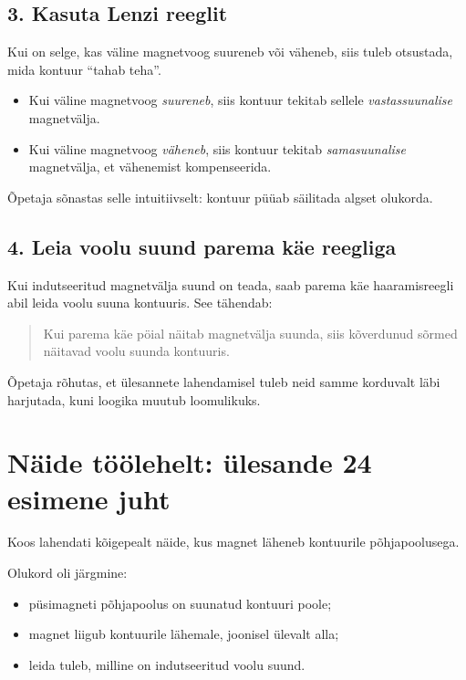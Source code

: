\documentclass[a4paper,11pt]{article}
\begin{document}
\subsection{3. Kasuta Lenzi reeglit}

Kui on selge, kas väline magnetvoog suureneb või väheneb, siis tuleb otsustada, mida kontuur ``tahab teha''.

\begin{itemize}
    \item Kui väline magnetvoog \emph{suureneb}, siis kontuur tekitab sellele \emph{vastassuunalise} magnetvälja.
    \item Kui väline magnetvoog \emph{väheneb}, siis kontuur tekitab \emph{samasuunalise} magnetvälja, et vähenemist kompenseerida.
\end{itemize}

Õpetaja sõnastas selle intuitiivselt: kontuur püüab säilitada algset olukorda.

\subsection{4. Leia voolu suund parema käe reegliga}

Kui indutseeritud magnetvälja suund on teada, saab parema käe haaramisreegli abil leida voolu suuna kontuuris. See tähendab:

\begin{quote}
Kui parema käe pöial näitab magnetvälja suunda, siis kõverdunud sõrmed näitavad voolu suunda kontuuris.
\end{quote}

Õpetaja rõhutas, et ülesannete lahendamisel tuleb neid samme korduvalt läbi harjutada, kuni loogika muutub loomulikuks.

\section{Näide töölehelt: ülesande 24 esimene juht}

Koos lahendati kõigepealt näide, kus magnet läheneb kontuurile põhjapoolusega.

Olukord oli järgmine:

\begin{itemize}
    \item püsimagneti põhjapoolus on suunatud kontuuri poole;
    \item magnet liigub kontuurile lähemale, joonisel ülevalt alla;
    \item leida tuleb, milline on indutseeritud voolu suund.
\end{itemize}
\end{document}
